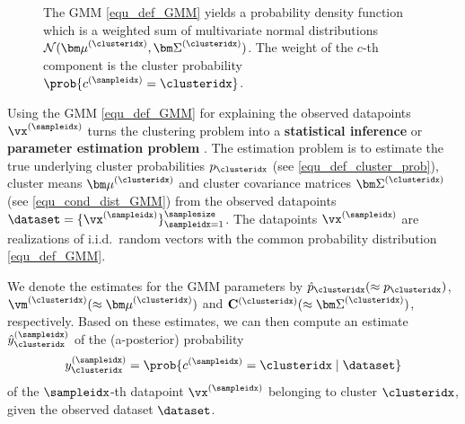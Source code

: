 \documentclass[12pt]{report}
\newcommand{\boundellipse}[3]%
{(#1) ellipse (#2 and #3)
}
\begin{document}
\begin{figure}
\begin{center}
\end{center}
\label{fig_GMM_elippses}
\caption{The GMM \eqref{equ_def_GMM} yields a probability 
	density function which is a weighted sum of multivariate 
	normal distributions $\mathcal{N}({\bm \mu}^{(\clusteridx)}, {\bm \Sigma}^{(\clusteridx)})$. 
    The weight of the $c$-th component is the cluster probability 
    $ \prob{c^{(\sampleidx)}=\clusteridx}$.}
\end{figure}

Using the GMM \eqref{equ_def_GMM} for explaining the observed 
datapoints $\vx^{(\sampleidx)}$ turns the clustering problem into 
a {\bf statistical inference} or {\bf parameter estimation problem} \cite{kay,LC}. 
The estimation problem is to estimate the true underlying cluster 
probabilities $p_{\clusteridx}$ (see \eqref{equ_def_cluster_prob}), cluster 
means ${\bm \mu}^{(\clusteridx)}$ and cluster covariance matrices 
${\bm \Sigma}^{(\clusteridx)}$ (see \eqref{equ_cond_dist_GMM}) from 
the observed datapoints $\dataset = \{ \vx^{(\sampleidx)} \}_{\sampleidx=1}^{\samplesize}$. 
The datapoints $\vx^{(\sampleidx)}$ are realizations of i.i.d.\ random vectors with 
the common probability distribution \eqref{equ_def_GMM}. 

We denote the estimates for the GMM parameters by $\hat{p}_{\clusteridx} (\approx p_{\clusteridx})$, $\vm^{(\clusteridx)} (\approx {\bm \mu}^{(\clusteridx)})$ and 
$\mathbf{C}^{(\clusteridx)} (\approx {\bm \Sigma}^{(\clusteridx)})$, respectively. 
Based on these estimates, we can then compute an estimate $\hat{y}_{\clusteridx}^{(\sampleidx)}$ 
of the (a-posterior) probability 
\begin{equation} 
y_{\clusteridx}^{(\sampleidx)} = \prob{c^{(\sampleidx)} = \clusteridx \mid \dataset }
\end{equation} 
of the $\sampleidx$-th datapoint $\vx^{(\sampleidx)}$ belonging 
to cluster $\clusteridx$, given the observed dataset $\dataset$. 
\end{document}
